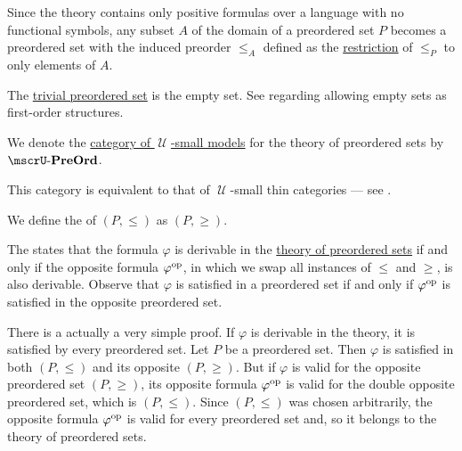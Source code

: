 \begin{definition}
\begin{thmenum}
     Since the theory contains only positive formulas over a language with no functional symbols, any subset \( A \) of the domain of a preordered set \( P \) becomes a preordered set with the induced preorder \( \leq_A \) defined as the \hyperref[def:binary_relation/restriction]{restriction} of \( \leq_P \) to only elements of \( A \).

     The \hyperref[thm:substructures_form_complete_lattice/bottom]{trivial preordered set} is the empty set. See  regarding allowing empty sets as first-order structures.

      We denote the \hyperref[def:category_of_small_first_order_models]{category of \( \mscrU \)-small models} for the theory of preordered sets by \( \ucat{PreOrd} \).

    This category is equivalent to that of \( \mscrU \)-small thin categories --- see .

     We define the  of \( (P, \leq) \) as \( (P, \geq) \).

    The  states that the formula \( \varphi \) is derivable in the \hyperref[def:preordered_set/theory]{theory of preordered sets} if and only if the opposite formula \( \varphi^{\operatorname{op}} \), in which we swap all instances of \( \leq \) and \( \geq \), is also derivable. Observe that \( \varphi \) is satisfied in a preordered set if and only if \( \varphi^{\operatorname{op}} \) is satisfied in the opposite preordered set.

    There is a actually a very simple proof. If \( \varphi \) is derivable in the theory, it is satisfied by every preordered set. Let \( P \) be a preordered set. Then \( \varphi \) is satisfied in both \( (P, \leq) \) and its opposite \( (P, \geq) \). But if \( \varphi \) is valid for the opposite preordered set \( (P, \geq) \), its opposite formula \( \varphi^{\operatorname{op}} \) is valid for the double opposite preordered set, which is \( (P, \leq) \). Since \( (P, \leq) \) was chosen arbitrarily, the opposite formula \( \varphi^{\operatorname{op}} \) is valid for every preordered set and, so it belongs to the theory of preordered sets.


\end{thmenum}
\end{definition}
